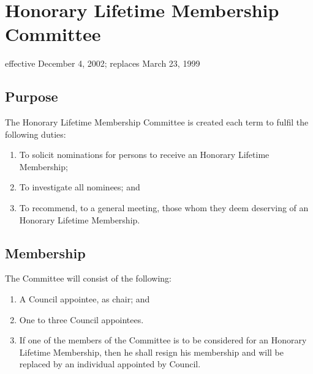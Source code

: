 \section{Honorary Lifetime Membership Committee}
effective December 4, 2002; replaces March 23, 1999

\subsection{Purpose}
The Honorary Lifetime Membership Committee is created each term to fulfil the following duties:
\begin{enumerate}
\item To solicit nominations for persons to receive an Honorary Lifetime Membership;
\item To investigate all nominees; and
\item To recommend, to a general meeting, those whom they deem deserving of an Honorary Lifetime Membership.
\end{enumerate}


\subsection{Membership}
The Committee will consist of the following:
\begin{enumerate}
\item A Council appointee, as chair; and
\item One to three Council appointees.
\item If one of the members of the Committee is to be considered for an Honorary Lifetime Membership, then he shall resign his membership and will be replaced by an individual appointed by Council.
\end{enumerate}

